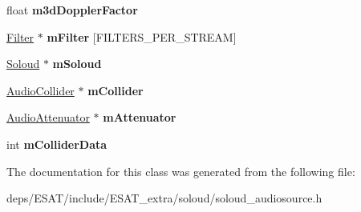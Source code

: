 \begin{DoxyCompactItemize}
float {\bfseries m3d\+Doppler\+Factor}
\item 
\mbox{\label{class_so_loud_1_1_audio_source_a294bed8e6837a86dad209b8afdaa79c7}} 
\mbox{\hyperlink{class_so_loud_1_1_filter}{Filter}} $\ast$ {\bfseries m\+Filter} \mbox{[}F\+I\+L\+T\+E\+R\+S\+\_\+\+P\+E\+R\+\_\+\+S\+T\+R\+E\+AM\mbox{]}
\item 
\mbox{\label{class_so_loud_1_1_audio_source_afc2e18fdd3f712a2e0a140d0332a89e7}} 
\mbox{\hyperlink{class_so_loud_1_1_soloud}{Soloud}} $\ast$ {\bfseries m\+Soloud}
\item 
\mbox{\label{class_so_loud_1_1_audio_source_aed2fd77e57a47ed3b32ea94dad48f3ba}} 
\mbox{\hyperlink{class_so_loud_1_1_audio_collider}{Audio\+Collider}} $\ast$ {\bfseries m\+Collider}
\item 
\mbox{\label{class_so_loud_1_1_audio_source_a557a1ec3830072cad40be75b4b854861}} 
\mbox{\hyperlink{class_so_loud_1_1_audio_attenuator}{Audio\+Attenuator}} $\ast$ {\bfseries m\+Attenuator}
\item 
\mbox{\label{class_so_loud_1_1_audio_source_a4a5224f8ea84fdbbebaebd0064e3911f}} 
int {\bfseries m\+Collider\+Data}
\end{DoxyCompactItemize}


The documentation for this class was generated from the following file\+:\begin{DoxyCompactItemize}
\item 
deps/\+E\+S\+A\+T/include/\+E\+S\+A\+T\+\_\+extra/soloud/soloud\+\_\+audiosource.\+h\end{DoxyCompactItemize}
